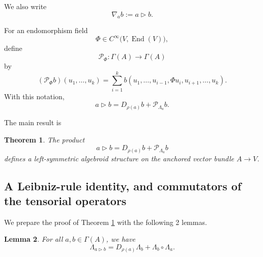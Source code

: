 \documentclass[12pt,reqno]{amsart}
\newtheorem{thm}{Theorem}[section]
\newtheorem{lemma}[thm]{Lemma}
\theoremstyle{definition}
\theoremstyle{remark}
\begin{document}
We also write
\begin{equation}
\nabla_ab:=a\triangleright b.
\label{eq:nabla-product}
\end{equation}

For an endomorphism field
\[
\Phi\in C^\infty\bigl(V,\operatorname{End}(V)\bigr),
\]
define
\[
\mathcal P_\Phi\colon\Gamma(A)\longrightarrow\Gamma(A)
\]
by
\begin{equation}
(\mathcal P_\Phi b)(u_1,\ldots,u_k)
=
\sum_{i=1}^k
b(u_1,\ldots,u_{i-1},
\Phi u_i,
u_{i+1},\ldots,u_k).
\label{eq:P-Phi}
\end{equation}
With this notation,
\[
a\triangleright b
=
D_{\rho(a)}b+\mathcal P_{\Lambda_a}b.
\]

The main result is
\begin{thm}\label{thm:Main}
The product
\[
a\triangleright b
=
D_{\rho(a)}b+\mathcal P_{\Lambda_a}b
\]
defines a left-symmetric algebroid structure on the anchored vector
bundle \(A\to V\).
\end{thm}



\subsection{A Leibniz-rule identity, and commutators of the tensorial operators}

We prepare the proof of Theorem \ref{thm:Main} with the following 2 lemmas.

\begin{lemma}
For all \(a,b\in\Gamma(A)\), we have
\begin{equation}
\Lambda_{a\triangleright b}
=
D_{\rho(a)}\Lambda_b
+
\Lambda_b\circ\Lambda_a.
\label{eq:Lambda-product-identity}
\end{equation}
\end{lemma}
\end{document}
